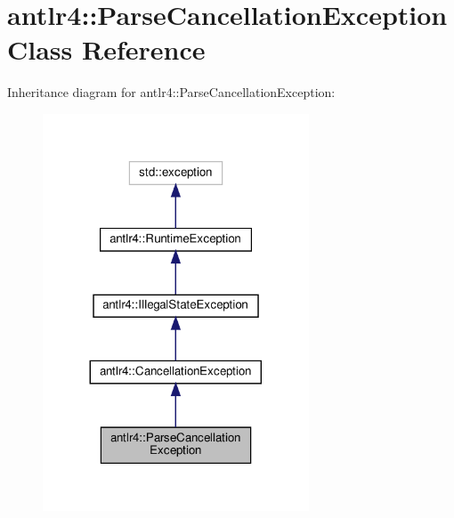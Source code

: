 \hypertarget{classantlr4_1_1ParseCancellationException}{}\section{antlr4\+:\+:Parse\+Cancellation\+Exception Class Reference}
\label{classantlr4_1_1ParseCancellationException}


Inheritance diagram for antlr4\+:\+:Parse\+Cancellation\+Exception\+:
\nopagebreak
\begin{figure}[H]
\begin{center}
\leavevmode
\includegraphics[width=224pt]{classantlr4_1_1ParseCancellationException__inherit__graph}
\end{center}
\end{figure}


